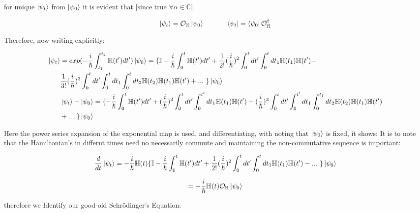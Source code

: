 \documentclass[8pt, twocoloumn]{article}
\begin{document}
for unique $\ket{\psi_t}$ from $\ket{\psi_0}$ it is evident that [since true $\forall \alpha \in \mathbb{C}$]

\begin{equation}
\ket{\psi_t} = \mathcal{O}_{\mathbb{H}}\ket{\psi_0} \ \ \ \ \ \ \ \  \ \  \bra{\psi_t}=\bra{\psi_0}\mathcal{O}_{\mathbb{H}}^{\dag}
\end{equation}

Therefore, now writing explicitly:




\begin{align}
\ket{\psi_t}
&= exp(-\frac{i}{\hbar}\int _{t_1}^{t_2} \mathbb{H}(t')dt')\ket{\psi_0}= \{ \mathbb{I} -\frac{i}{\hbar}\int _{0}^{t} \mathbb{H}(t')dt' + \frac{1}{2!}(\frac{i}{\hbar})^2 \int _{0}^{t}dt' \int_{0}^{t} dt_1 \mathbb{H}(t_1)\mathbb{H}(t')- \nonumber \\
& \frac{1}{3!}(\frac{i}{\hbar})^3\int _{0}^{t}dt' \int_{0}^{t} dt_1 \int_{0}^{t} dt_2 \mathbb{H}(t_2) \mathbb{H}(t_1)\mathbb{H}(t') + . . .  \ \} \ket{\psi_0} \nonumber \\
& \ket{\psi_t} - \ket{\psi_0} = \{-\frac{i}{\hbar}\int _{0}^{t} \mathbb{H}(t')dt' + (\frac{i}{\hbar})^2 \int _{0}^{t}dt' \int_{0}^{t'} dt_1 \mathbb{H}(t_1)\mathbb{H}(t')-   (\frac{i}{\hbar})^3\int _{0}^{t}dt' \int_{0}^{t'} dt_1 \int_{0}^{t_1} dt_2 \mathbb{H}(t_2) \mathbb{H}(t_1)\mathbb{H}(t') \nonumber \\ 
& + . . .  \ \} \ket{\psi_0}
\end{align}


Here the power series expansion of the exponential map is used, and differentiating, with noting that $\ket{\psi_0}$ is fixed, it shows:  {It is to note that the Hamiltonian's in differnt times need no necessarily commute and maintaining the non-commutative sequence is important}:



\begin{align}
\frac{d}{dt}\ket{\psi_t}= -\frac{i}{\hbar}\mathbb{H}(t) 
\{ \mathbb{I} -\frac{i}{\hbar}\int _{0}^{t} \mathbb{H}(t')dt' + \frac{1}{2!}(\frac{i}{\hbar})^2 \int _{0}^{t}dt' \int_{0}^{t} dt_1 \mathbb{H}(t_1)\mathbb{H}(t')- ... \ \} \ket{\psi_0} \nonumber 
\end{align}

\begin{equation}
= -\frac{i}{\hbar}\mathbb{H}(t) \mathcal{O}_{\mathbb{H}}\ket{\psi_0}
\end{equation}

therefore we Identify our good-old Schrödinger's Equation: 
\end{document}
